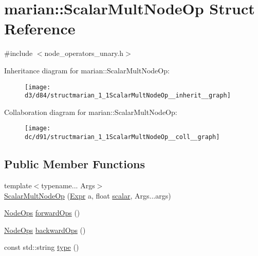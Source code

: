 \hypertarget{structmarian_1_1ScalarMultNodeOp}{}\section{marian\+:\+:Scalar\+Mult\+Node\+Op Struct Reference}
\label{structmarian_1_1ScalarMultNodeOp}


{\ttfamily \#include $<$node\+\_\+operators\+\_\+unary.\+h$>$}



Inheritance diagram for marian\+:\+:Scalar\+Mult\+Node\+Op\+:
\nopagebreak
\begin{figure}[H]
\begin{center}
\leavevmode
\texttt{[image: d3/d84/structmarian\_1\_1ScalarMultNodeOp\_\_inherit\_\_graph]}
\end{center}
\end{figure}


Collaboration diagram for marian\+:\+:Scalar\+Mult\+Node\+Op\+:
\nopagebreak
\begin{figure}[H]
\begin{center}
\leavevmode
\texttt{[image: dc/d91/structmarian\_1\_1ScalarMultNodeOp\_\_coll\_\_graph]}
\end{center}
\end{figure}
\subsection*{Public Member Functions}
\begin{DoxyCompactItemize}
\item 
{\footnotesize template$<$typename... Args$>$ }\\\hyperlink{structmarian_1_1ScalarMultNodeOp_af388a2ca40cc9ba916da11ee31b01838}{Scalar\+Mult\+Node\+Op} (\hyperlink{namespacemarian_a498d8baf75b754011078b890b39c8e12}{Expr} a, float \hyperlink{classmarian_1_1Node_a078122f6a9c2df448139780a1e3a323b}{scalar}, Args...\+args)
\item 
\hyperlink{namespacemarian_a4956376218cc236016c20bc4071470da}{Node\+Ops} \hyperlink{structmarian_1_1ScalarMultNodeOp_aea3d4960c02b19c9c1ce9a82a0612bed}{forward\+Ops} ()
\item 
\hyperlink{namespacemarian_a4956376218cc236016c20bc4071470da}{Node\+Ops} \hyperlink{structmarian_1_1ScalarMultNodeOp_ae090e81626c938ff80aa51f0ec738e43}{backward\+Ops} ()
\item 
const std\+::string \hyperlink{structmarian_1_1ScalarMultNodeOp_a1b6803c97ccd411a77c76cc0307b6b0e}{type} ()
\end{DoxyCompactItemize}
